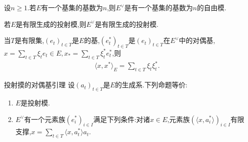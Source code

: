 \begin{proposition}{}{}
	设$n\geq 1$.若$E$有一个基集的基数为$n$,则$E^{\vee}$是有一个基集的基数为$n$的自由模.
\end{proposition}

\begin{corollary}{}{}
	若$E$是有限生成的投射模,则$E^{\vee}$是有限生成的投射模.
\end{corollary}

\begin{remark}{}{}
	当$T$是有限集,$\left(e_{t}\right)_{t\in T}$是$E$的基,$\left(e_{t}^{\ast}\right)_{t\in T}$是$\left(e_{t}\right)_{t\in T}$在$E^{\vee}$中的对偶基,$x=\sum\limits_{t\in T}\xi_{t}e_{t}\in E,x_{\ast}=\sum\limits_{t\in T}\xi_{t}^{\ast}e_{t}^{\ast}$,则
	\begin{align*}
		\langle x,x^{\ast}\rangle_{E}=\sum\limits_{t\in T}\xi_{t}\xi_{t}^{\ast}.
	\end{align*}
\end{remark}

\begin{proposition}{投射摸的对偶基引理}{}
	设$\left(a_{t}\right)_{t\in T}$是$E$的生成系.下列命题等价:
	\begin{enumerate}
		\item $E$是投射模.
		\item $E^{\vee}$有一个元素族$\left(e_{i}^{\ast}\right)_{i\in I}$满足下列条件:对诸$x\in E$,元素族$\left(\langle x,a_{i}^{\ast}\rangle\right)_{i\in I}$有限支撑,$x=\sum\limits_{t\in T}\langle x,a_{t}^{\ast}\rangle a_{t}$.
	\end{enumerate}
\end{proposition}